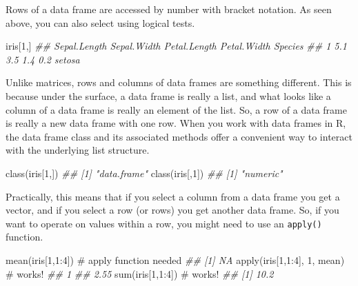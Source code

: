 \documentclass[
  13,
  letterpaper,
]{report}
\newenvironment{Shaded}{\begin{snugshade}}{\end{snugshade}}
\newcommand{\CommentTok}[1]{\textcolor[rgb]{0.37,0.37,0.37}{#1}}
\newcommand{\DecValTok}[1]{\textcolor[rgb]{0.68,0.00,0.00}{#1}}
\newcommand{\DocumentationTok}[1]{\textcolor[rgb]{0.37,0.37,0.37}{\textit{#1}}}
\newcommand{\FunctionTok}[1]{\textcolor[rgb]{0.28,0.35,0.67}{#1}}
\newcommand{\NormalTok}[1]{\textcolor[rgb]{0.00,0.23,0.31}{#1}}
\newcommand{\SpecialCharTok}[1]{\textcolor[rgb]{0.37,0.37,0.37}{#1}}
\newcommand{\StringTok}[1]{\textcolor[rgb]{0.13,0.47,0.30}{#1}}
\begin{document}
Rows of a data frame are accessed by number with bracket notation. As
seen above, you can also select using logical tests.

\begin{Shaded}
\begin{Highlighting}[]
\NormalTok{iris[}\DecValTok{1}\NormalTok{,]}
\DocumentationTok{\#\#   Sepal.Length Sepal.Width Petal.Length Petal.Width Species}
\DocumentationTok{\#\# 1          5.1         3.5          1.4         0.2  setosa}
\end{Highlighting}
\end{Shaded}

\begin{Shaded}
\end{Shaded}

Unlike matrices, rows and columns of data frames are something
different. This is because under the surface, a data frame is really a
list, and what looks like a column of a data frame is really an element
of the list. So, a row of a data frame is really a new data frame with
one row. When you work with data frames in R, the data frame class and
its associated methods offer a convenient way to interact with the
underlying list structure.

\begin{Shaded}
\begin{Highlighting}[]
\FunctionTok{class}\NormalTok{(iris[}\DecValTok{1}\NormalTok{,])}
\DocumentationTok{\#\# [1] "data.frame"}
\FunctionTok{class}\NormalTok{(iris[,}\DecValTok{1}\NormalTok{])}
\DocumentationTok{\#\# [1] "numeric"}
\end{Highlighting}
\end{Shaded}

Practically, this means that if you select a column from a data frame
you get a vector, and if you select a row (or rows) you get another data
frame. So, if you want to operate on values within a row, you might need
to use an \texttt{apply()} function.

\begin{Shaded}
\begin{Highlighting}[]
\FunctionTok{mean}\NormalTok{(iris[}\DecValTok{1}\NormalTok{,}\DecValTok{1}\SpecialCharTok{:}\DecValTok{4}\NormalTok{])           }\CommentTok{\# apply function needed}
\DocumentationTok{\#\# [1] NA}
\FunctionTok{apply}\NormalTok{(iris[}\DecValTok{1}\NormalTok{,}\DecValTok{1}\SpecialCharTok{:}\DecValTok{4}\NormalTok{], }\DecValTok{1}\NormalTok{, mean) }\CommentTok{\# works!}
\DocumentationTok{\#\#    1 }
\DocumentationTok{\#\# 2.55}
\FunctionTok{sum}\NormalTok{(iris[}\DecValTok{1}\NormalTok{,}\DecValTok{1}\SpecialCharTok{:}\DecValTok{4}\NormalTok{])            }\CommentTok{\# works!}
\DocumentationTok{\#\# [1] 10.2}
\end{Highlighting}
\end{Shaded}
\end{document}
